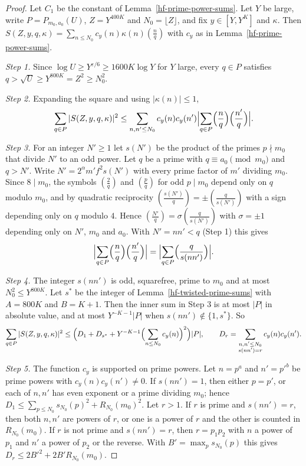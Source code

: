 \begin{proof}
Let $C_1$ be the constant of Lemma~\ref{hf-prime-power-sums}. Let $Y$ be large, write
$P=P_{m_0,a_0}(U)$, $Z=Y^{400K}$ and $N_0=\lfloor Z\rfloor$, and fix $y\in[Y,Y^K]$ and $\kappa$.
Then $S(Z,y,q,\kappa)=\sum_{n\leq N_0}c_y(n)\kappa(n)\left(\frac nq\right)$ with $c_y$ as in
Lemma~\ref{hf-prime-power-sums}.

\emph{Step 1.} Since $\log U\geq Y^{\varepsilon/6}\geq1600K\log Y$ for $Y$ large, every $q\in P$
satisfies $q>\sqrt U\geq Y^{800K}=Z^2\geq N_0^2$.

\emph{Step 2.} Expanding the square and using $|\kappa(n)|\leq1$,
\[
 \sum_{q\in P}|S(Z,y,q,\kappa)|^2\leq\sum_{n,n'\leq N_0}c_y(n)c_y(n')\Bigl|\sum_{q\in P}
 \Bigl(\frac nq\Bigr)\Bigl(\frac{n'}q\Bigr)\Bigr|.
\]

\emph{Step 3.} For an integer $N'\geq1$ let $s(N')$ be the product of the primes $p\nmid m_0$ that
divide $N'$ to an odd power. Let $q$ be a prime with $q\equiv a_0\pmod{m_0}$ and $q>N'$. Write
$N'=2^\alpha m'f^2s(N')$ with every prime factor of $m'$ dividing $m_0$. Since $8\mid m_0$, the
symbols $\left(\frac2q\right)$ and $\left(\frac{p}{q}\right)$ for odd $p\mid m_0$ depend only on $q$
modulo $m_0$, and by quadratic reciprocity
$\left(\frac{s(N')}q\right)=\pm\left(\frac q{s(N')}\right)$ with a sign depending only on $q$ modulo
$4$. Hence $\left(\frac{N'}q\right)=\sigma\left(\frac q{s(N')}\right)$ with $\sigma=\pm1$ depending
only on $N'$, $m_0$ and $a_0$. With $N'=nn'<q$ (Step 1) this gives
\[
 \Bigl|\sum_{q\in P}\Bigl(\frac nq\Bigr)\Bigl(\frac{n'}q\Bigr)\Bigr|
 =\Bigl|\sum_{q\in P}\Bigl(\frac q{s(nn')}\Bigr)\Bigr|.
\]

\emph{Step 4.} The integer $s(nn')$ is odd, squarefree, prime to $m_0$ and at most
$N_0^2\leq Y^{800K}$. Let $s^*$ be the integer of Lemma~\ref{hf-twisted-prime-sums} with $A=800K$
and $B=K+1$. Then the inner sum in Step 3 is at most $|P|$ in absolute value, and at most
$Y^{-K-1}|P|$ when $s(nn')\notin\{1,s^*\}$. So
\[
 \sum_{q\in P}|S(Z,y,q,\kappa)|^2\leq\Bigl(D_1+D_{s^*}+Y^{-K-1}\Bigl(\sum_{n\leq N_0}c_y(n)\Bigr)^2\Bigr)|P|,
 \qquad D_r=\sum_{\substack{n,n'\leq N_0\\ s(nn')=r}}c_y(n)c_y(n').
\]

\emph{Step 5.} The function $c_y$ is supported on prime powers. Let $n=p^a$ and $n'=p'^b$ be prime
powers with $c_y(n)c_y(n')\neq0$. If $s(nn')=1$, then either $p=p'$, or each of $n,n'$ has even
exponent or a prime dividing $m_0$; hence $D_1\leq\sum_{p\leq N_0}s_{N_0}(p)^2+R_{N_0}(m_0)^2$. Let
$r>1$. If $r$ is prime and $s(nn')=r$, then both $n,n'$ are powers of $r$, or one is a power of $r$
and the other is counted in $R_{N_0}(m_0)$. If $r$ is not prime and $s(nn')=r$, then $r=p_1p_2$ with
$n$ a power of $p_1$ and $n'$ a power of $p_2$ or the reverse. With $B'=\max_ps_{N_0}(p)$ this gives
$D_r\leq2B'^2+2B'R_{N_0}(m_0)$.


\end{proof}
